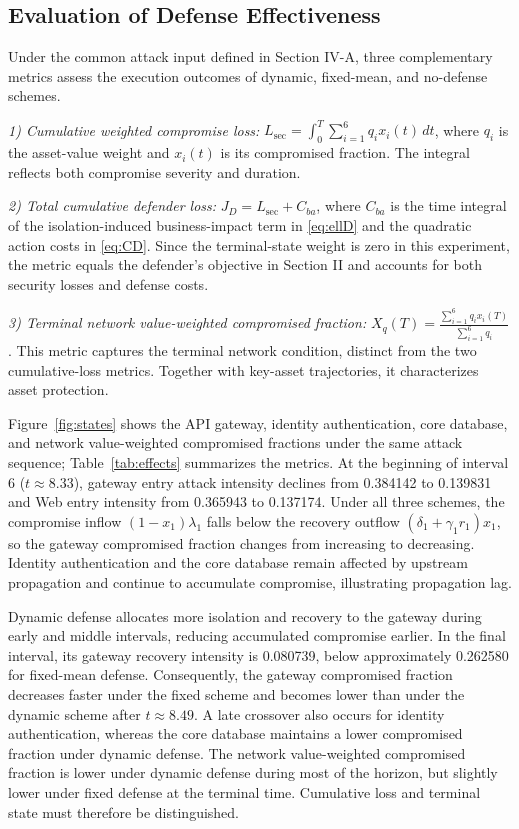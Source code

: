 \documentclass[conference,letterpaper]{IEEEtran}
\begin{document}
\subsection{Evaluation of Defense Effectiveness}
Under the common attack input defined in Section IV-A, three complementary metrics assess the execution outcomes of dynamic, fixed-mean, and no-defense schemes.

\emph{1) Cumulative weighted compromise loss:} $L_{\mathrm{sec}}=\int_0^T\sum_{i=1}^6q_i x_i(t)\,dt$, where $q_i$ is the asset-value weight and $x_i(t)$ is its compromised fraction. The integral reflects both compromise severity and duration.

\emph{2) Total cumulative defender loss:} $J_D=L_{\mathrm{sec}}+C_{ba}$, where $C_{ba}$ is the time integral of the isolation-induced business-impact term in \eqref{eq:ellD} and the quadratic action costs in \eqref{eq:CD}. Since the terminal-state weight is zero in this experiment, the metric equals the defender's objective in Section II and accounts for both security losses and defense costs.

\emph{3) Terminal network value-weighted compromised fraction:} $X_q(T)=\frac{\sum_{i=1}^6 q_i x_i(T)}{\sum_{i=1}^6q_i}$. This metric captures the terminal network condition, distinct from the two cumulative-loss metrics. Together with key-asset trajectories, it characterizes asset protection.

Figure~\ref{fig:states} shows the API gateway, identity authentication, core database, and network value-weighted compromised fractions under the same attack sequence; Table~\ref{tab:effects} summarizes the metrics. At the beginning of interval 6 ($t\approx8.33$), gateway entry attack intensity declines from 0.384142 to 0.139831 and Web entry intensity from 0.365943 to 0.137174. Under all three schemes, the compromise inflow $(1-x_1)\lambda_1$ falls below the recovery outflow $(\delta_1+\gamma_1r_1)x_1$, so the gateway compromised fraction changes from increasing to decreasing. Identity authentication and the core database remain affected by upstream propagation and continue to accumulate compromise, illustrating propagation lag.

Dynamic defense allocates more isolation and recovery to the gateway during early and middle intervals, reducing accumulated compromise earlier. In the final interval, its gateway recovery intensity is 0.080739, below approximately 0.262580 for fixed-mean defense. Consequently, the gateway compromised fraction decreases faster under the fixed scheme and becomes lower than under the dynamic scheme after $t\approx8.49$. A late crossover also occurs for identity authentication, whereas the core database maintains a lower compromised fraction under dynamic defense. The network value-weighted compromised fraction is lower under dynamic defense during most of the horizon, but slightly lower under fixed defense at the terminal time. Cumulative loss and terminal state must therefore be distinguished.
\end{document}

